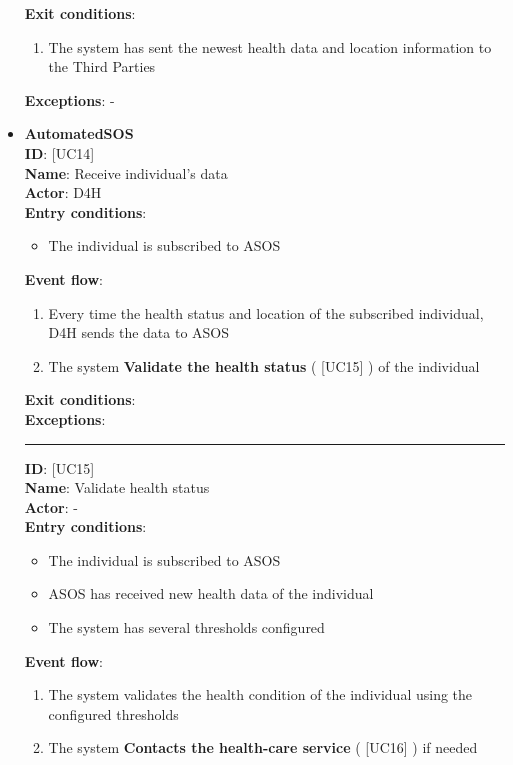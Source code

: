 \documentclass[a4paper, hidelinks, 12pt]{report}
\newcommand\usecase[1]{ [UC#1] }
\begin{document}
\begin{itemize}
\begin{enumerate}
		\end{enumerate}
		\textbf{Exit conditions}:
		\begin{enumerate}
			\item{The system has sent the newest health data and location information to the Third Parties}
		\end{enumerate}
		\textbf{Exceptions}: -
		\item{\textbf{AutomatedSOS}}\\
		\textbf{ID}: \usecase{14} \\
		\textbf{Name}: Receive individual's data \\
		\textbf{Actor}: D4H \\
		\textbf{Entry conditions}:
		\begin{itemize}
			\item{The individual is subscribed to ASOS}
		\end{itemize}
		\textbf{Event flow}:
		\begin{enumerate}
			\item{Every time the health status and location of the subscribed individual, D4H sends the data to ASOS}
			\item{The system \textbf{Validate the health status} (\usecase{15}) of the individual}
		\end{enumerate}
		\textbf{Exit conditions}: \\
		\textbf{Exceptions}: \\
		\rule{\linewidth}{0.4pt}
		\textbf{ID}: \usecase{15} \\
		\textbf{Name}: Validate health status \\
		\textbf{Actor}: - \\
		\textbf{Entry conditions}:
		\begin{itemize}
			\item{The individual is subscribed to ASOS}
			\item{ASOS has received new health data of the individual}
			\item{The system has several thresholds configured}
		\end{itemize}
		\textbf{Event flow}:
		\begin{enumerate}
			\item{The system validates the health condition of the individual using the configured thresholds}
			\item{The system \textbf{Contacts the health-care service} (\usecase{16}) if needed}

\end{enumerate}
\end{itemize}
\end{document}
